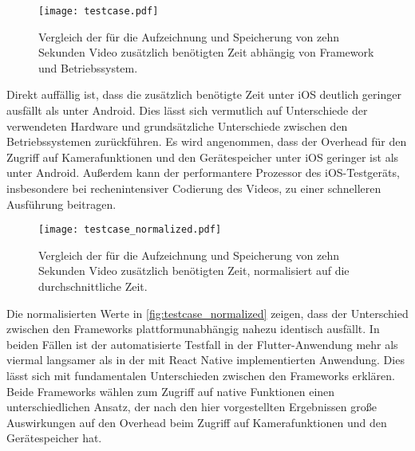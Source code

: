 \begin{figure}[ht]
  \centering 
  \texttt{[image: testcase.pdf]}
  \caption{Vergleich der für die Aufzeichnung und Speicherung von zehn Sekunden Video zusätzlich benötigten Zeit abhängig von Framework und Betriebssystem.}
  \label{fig:testcase}
\end{figure}

Direkt auffällig ist, dass die zusätzlich benötigte Zeit unter iOS deutlich geringer ausfällt als unter Android.
Dies lässt sich vermutlich auf Unterschiede der verwendeten Hardware und grundsätzliche Unterschiede zwischen den Betriebssystemen zurückführen.
Es wird angenommen, dass der Overhead für den Zugriff auf Kamerafunktionen und den Gerätespeicher unter iOS geringer ist als unter Android.
Außerdem kann der performantere Prozessor des iOS-Testgeräts, insbesondere bei rechenintensiver Codierung des Videos, zu einer schnelleren Ausführung beitragen.

\begin{figure}[ht]
  \centering 
  \texttt{[image: testcase\_normalized.pdf]}
  \caption{Vergleich der für die Aufzeichnung und Speicherung von zehn Sekunden Video zusätzlich benötigten Zeit, normalisiert auf die durchschnittliche Zeit.}
  \label{fig:testcase_normalized}
\end{figure}
Die normalisierten Werte in \autoref{fig:testcase_normalized} zeigen, dass der Unterschied zwischen den Frameworks plattformunabhängig nahezu identisch ausfällt.
In beiden Fällen ist der automatisierte Testfall in der Flutter-Anwendung mehr als viermal langsamer als in der mit React Native implementierten Anwendung.
Dies lässt sich mit fundamentalen Unterschieden zwischen den Frameworks erklären.
Beide Frameworks wählen zum Zugriff auf native Funktionen einen unterschiedlichen Ansatz, der nach den hier vorgestellten Ergebnissen große Auswirkungen auf den Overhead beim Zugriff auf Kamerafunktionen und den Gerätespeicher hat.

